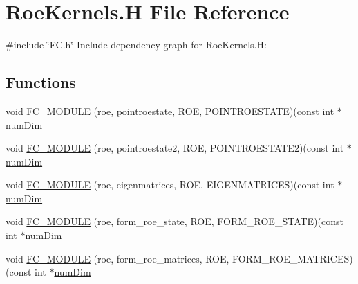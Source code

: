 \hypertarget{RoeKernels_8H}{}\section{Roe\+Kernels.\+H File Reference}
\label{RoeKernels_8H}
{\ttfamily \#include \char`\"{}F\+C.\+h\char`\"{}}\newline
Include dependency graph for Roe\+Kernels.\+H\+:
\subsection*{Functions}
\begin{DoxyCompactItemize}
\item 
void \hyperlink{RoeKernels_8H_a52b10908b1958b2c6611bf1fb569b396}{F\+C\+\_\+\+M\+O\+D\+U\+LE} (roe, pointroestate, R\+OE, P\+O\+I\+N\+T\+R\+O\+E\+S\+T\+A\+TE)(const int $\ast$\hyperlink{SATKernels_8H_a680185db8546de161968dabace9e94f1}{num\+Dim}
\item 
void \hyperlink{RoeKernels_8H_a088a5f6038376dc46cbc26a51cc9fb21}{F\+C\+\_\+\+M\+O\+D\+U\+LE} (roe, pointroestate2, R\+OE, P\+O\+I\+N\+T\+R\+O\+E\+S\+T\+A\+T\+E2)(const int $\ast$\hyperlink{SATKernels_8H_a680185db8546de161968dabace9e94f1}{num\+Dim}
\item 
void \hyperlink{RoeKernels_8H_aa96fdd8710098fc1c148d5677dc0e3cc}{F\+C\+\_\+\+M\+O\+D\+U\+LE} (roe, eigenmatrices, R\+OE, E\+I\+G\+E\+N\+M\+A\+T\+R\+I\+C\+ES)(const int $\ast$\hyperlink{SATKernels_8H_a680185db8546de161968dabace9e94f1}{num\+Dim}
\item 
void \hyperlink{RoeKernels_8H_a7cbc5c0e16634b11889efa9e6ac983c4}{F\+C\+\_\+\+M\+O\+D\+U\+LE} (roe, form\+\_\+roe\+\_\+state, R\+OE, F\+O\+R\+M\+\_\+\+R\+O\+E\+\_\+\+S\+T\+A\+TE)(const int $\ast$\hyperlink{SATKernels_8H_a680185db8546de161968dabace9e94f1}{num\+Dim}
\item 
void \hyperlink{RoeKernels_8H_a341cfd2959d425a676b8174cdedce055}{F\+C\+\_\+\+M\+O\+D\+U\+LE} (roe, form\+\_\+roe\+\_\+matrices, R\+OE, F\+O\+R\+M\+\_\+\+R\+O\+E\+\_\+\+M\+A\+T\+R\+I\+C\+ES)(const int $\ast$\hyperlink{SATKernels_8H_a680185db8546de161968dabace9e94f1}{num\+Dim}
\end{DoxyCompactItemize}
